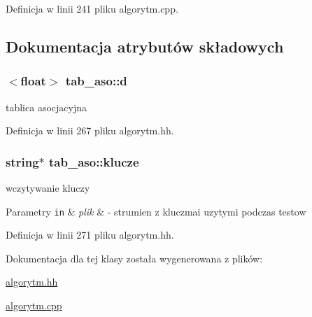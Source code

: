 Definicja w linii 241 pliku algorytm.\-cpp.



\subsection{Dokumentacja atrybutów składowych}
\hypertarget{classtab__aso_a5ee486c3f7635778bcb585cc655f5245}{
\subsubsection[{d}]{$<$float$>$ tab\-\_\-aso\-::d\hspace{0.3cm}{\ttfamily [private]}}}\label{classtab__aso_a5ee486c3f7635778bcb585cc655f5245}


tablica asocjacyjna 



Definicja w linii 267 pliku algorytm.\-hh.

\hypertarget{classtab__aso_aa9d7d3471353afaa7585c6bbcd8e26a5}{
\subsubsection[{klucze}]{\setlength{\rightskip}{0pt plus 5cm}string$\ast$ tab\-\_\-aso\-::klucze\hspace{0.3cm}{\ttfamily [private]}}}\label{classtab__aso_aa9d7d3471353afaa7585c6bbcd8e26a5}


wczytywanie kluczy 


\begin{DoxyParams}[1]{Parametry}
\mbox{\tt in}  & {\em plik} & -\/ strumien z kluczmai uzytymi podczas testow \\
\hline
\end{DoxyParams}


Definicja w linii 271 pliku algorytm.\-hh.



Dokumentacja dla tej klasy została wygenerowana z plików\-:\begin{DoxyCompactItemize}
\item 
\hyperlink{algorytm_8hh}{algorytm.\-hh}\item 
\hyperlink{algorytm_8cpp}{algorytm.\-cpp}\end{DoxyCompactItemize}
